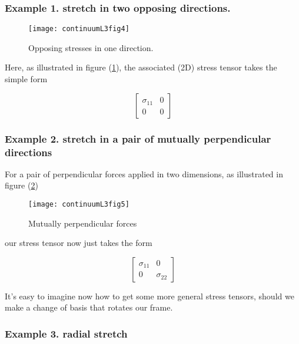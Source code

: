 \subsubsection{Example 1.  stretch in two opposing directions.}

\begin{figure}[htp]
   \centering
   \texttt{[image: continuumL3fig4]}
   \caption{Opposing stresses in one direction.}\label{fig:continuumL3:continuumL3fig4}
\end{figure}

Here, as illustrated in figure (\ref{fig:continuumL3:continuumL3fig4}), the associated (2D) stress tensor takes the simple form

\begin{equation}\label{eqn:continuumL3:370}
\begin{bmatrix}
\sigma_{11} & 0 \\
0 & 0
\end{bmatrix}
\end{equation}

\subsubsection{Example 2.  stretch in a pair of mutually perpendicular directions}

For a pair of perpendicular forces applied in two dimensions, as illustrated in figure (\ref{fig:continuumL3:continuumL3fig5})
\begin{figure}[htp]
   \centering
   \texttt{[image: continuumL3fig5]}
   \caption{Mutually perpendicular forces}\label{fig:continuumL3:continuumL3fig5}
\end{figure}

our stress tensor now just takes the form

\begin{equation}\label{eqn:continuumL3:390}
\begin{bmatrix}
\sigma_{11} & 0 \\
0 & \sigma_{22}
\end{bmatrix}
\end{equation}

It's easy to imagine now how to get some more general stress tensors, should we make a change of basis that rotates our frame.

\subsubsection{Example 3.  radial stretch}

